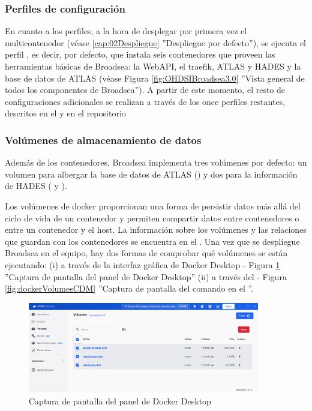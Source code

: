 \subsubsection{Perfiles de configuración} 

En cuanto a los perfiles, a la hora de desplegar por primera vez el multicontenedor (véase \ref{cap:02Despliegue} ''Despliegue por defecto''), se ejecuta el perfil , es decir, por defecto, que instala seis contenedores que proveen las herramientas básicas de Broadsea:  la WebAPI, el traefik, ATLAS y HADES y la base de datos de ATLAS (véase Figura \ref{fig:OHDSIBroadsea3.0} ''Vista general de todos los componentes de Broadsea''). A partir de este momento, el resto de configuraciones adicionales se realizan a través de los once perfiles restantes, descritos en el  y en el repositorio \parencite{githubBroadsea}

\subsubsection{Volúmenes de almacenamiento de datos}

Además de los contenedores, Broadsea implementa tres volúmenes por defecto: un volumen para albergar la base de datos de ATLAS () y dos para la información de HADES ( y ). 

Los volúmenes de docker proporcionan una forma de persistir datos más allá del ciclo de vida de un contenedor y permiten compartir datos entre contenedores o entre un contenedor y el host. La información sobre los volúmenes y las relaciones que guardan con los contenedores se encuentra en el . Una vez que se despliegue Broadsea en el equipo, hay dos formas de comprobar qué volúmenes se están ejecutando: (i) a través de la interfaz gráfica de Docker Desktop - Figura \ref{fig:dockerVolumes} ''Captura de pantalla del panel  de Docker Desktop'' (ii) a través del  - Figura \ref{fig:dockerVolumesCDM} ''Captura de pantalla del comando  en el ''.

\begin{figure}[H]
    \centering
    \includegraphics[width=0.90\textwidth]{figures/dockerVolumes.png}
     \caption{Captura de pantalla del panel  de Docker Desktop}
    \label{fig:dockerVolumes}
\end{figure}

